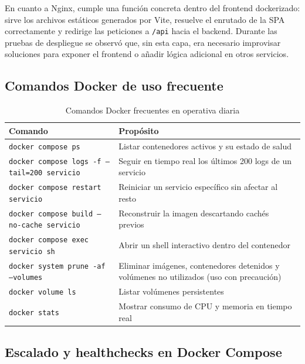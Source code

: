 \documentclass[11pt, a4paper]{article}
\begin{document}
En cuanto a Nginx, cumple una funci\'on concreta dentro del frontend dockerizado: sirve los archivos est\'{a}ticos generados por Vite, resuelve el enrutado de la SPA correctamente y redirige las peticiones a \texttt{/api} hacia el backend. Durante las pruebas de despliegue se observ\'o que, sin esta capa, era necesario improvisar soluciones para exponer el frontend o a\~nadir l\'ogica adicional en otros servicios.

\subsection{Comandos Docker de uso frecuente}

\begin{table}[H]
\centering
\small
\renewcommand{\arraystretch}{1.4}
\begin{tabular}{@{}lp{9cm}@{}}
\toprule
\textbf{Comando} & \textbf{Prop\'{o}sito} \\
\midrule
\texttt{docker compose ps} & Listar contenedores activos y su estado de salud \\
\texttt{docker compose logs -f --tail=200 servicio} & Seguir en tiempo real los \'{u}ltimos 200 logs de un servicio \\
\texttt{docker compose restart servicio} & Reiniciar un servicio espec\'{i}fico sin afectar al resto \\
\texttt{docker compose build --no-cache servicio} & Reconstruir la imagen descartando cach\'{e}s previos \\
\texttt{docker compose exec servicio sh} & Abrir un shell interactivo dentro del contenedor \\
\texttt{docker system prune -af --volumes} & Eliminar im\'{a}genes, contenedores detenidos y vol\'{u}menes no utilizados (uso con precauci\'{o}n) \\
\texttt{docker volume ls} & Listar vol\'{u}menes persistentes \\
\texttt{docker stats} & Mostrar consumo de CPU y memoria en tiempo real \\
\bottomrule
\end{tabular}
\caption{Comandos Docker frecuentes en operativa diaria}
\label{tab:docker-cmds}
\end{table}

\subsection{Escalado y healthchecks en Docker Compose}
\end{document}
